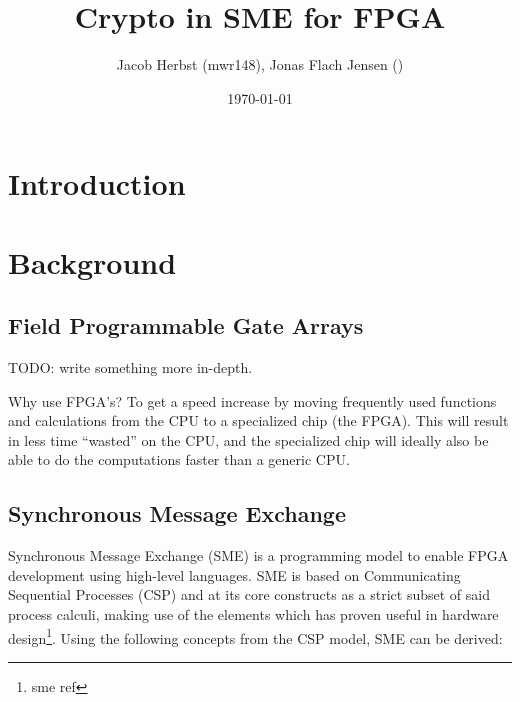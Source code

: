 \documentclass[a4paper]{article}
\author{Jacob Herbst (mwr148), Jonas Flach Jensen ()}
\date{\today}
\title{Crypto in SME for FPGA}
\begin{document}
\maketitle
\tableofcontents

\newpage
\section{Introduction}
\label{sec:org68c8ede}

\section{Background}
\label{sec:orgaaca26c}

\subsection{Field Programmable Gate Arrays}
\label{sec:orgaaf8025}
TODO: write something more in-depth.

Why use FPGA's? To get a speed increase by moving frequently used functions and calculations from the CPU to a specialized chip (the FPGA).
This will result in less time ``wasted'' on the CPU, and the specialized chip will ideally also be able to do the computations faster than a generic CPU.

\subsection{Synchronous Message Exchange}
\label{SME}
Synchronous Message Exchange (SME) is a programming model to enable FPGA development using high-level languages. SME is based on Communicating Sequential Processes (CSP) and at its core constructs as a strict subset of said process calculi, making use of the elements which has proven useful in hardware design\cite{sme}\footnote{sme ref}. Using the following concepts from the CSP model, SME can be derived:
\end{document}
